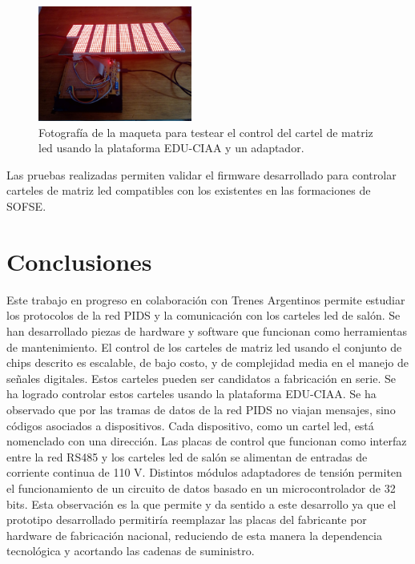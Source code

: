 \documentclass[conference]{IEEEtran}
\begin{document}
\begin{figure}[htbp]
\centerline{\includegraphics[width=0.45\textwidth]{fotoCartelTest.jpg}}
\caption{Fotografía de la maqueta para testear el control del cartel de matriz led usando la plataforma EDU-CIAA y un adaptador.}
\label{fig. foto Cartel home}
\end{figure}

Las pruebas realizadas permiten validar el firmware desarrollado para controlar carteles de matriz led compatibles con los existentes en las formaciones de SOFSE.\\


\section{Conclusiones}

Este trabajo en progreso en colaboración con Trenes Argentinos permite estudiar los protocolos de la red PIDS y la comunicación con los carteles led de salón. Se han desarrollado piezas de hardware y software que funcionan como herramientas de mantenimiento. El control de los carteles de matriz led usando el conjunto de chips descrito es escalable, de bajo costo, y de complejidad media en el manejo de señales digitales. Estos carteles pueden ser candidatos a fabricación en serie. Se ha logrado controlar estos carteles usando la plataforma EDU-CIAA. Se ha observado que por las tramas de datos de la red PIDS no viajan mensajes, sino códigos asociados a dispositivos. Cada dispositivo, como un cartel led, está nomenclado con una dirección. Las placas de control que funcionan como interfaz entre la red RS485 y los carteles led de salón se alimentan de entradas de corriente continua de 110 V. Distintos módulos adaptadores de tensión permiten el funcionamiento de un circuito de datos basado en un microcontrolador de 32 bits. Esta observación es la que permite y da sentido a este desarrollo ya que el prototipo desarrollado permitiría reemplazar las placas del fabricante por hardware de fabricación nacional, reduciendo de esta manera la dependencia tecnológica y acortando las cadenas de suministro.
\end{document}
